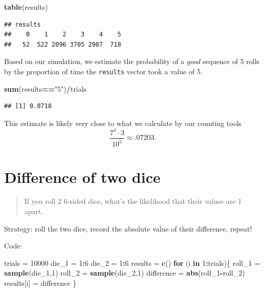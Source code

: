 \documentclass[
]{book}
\newenvironment{Shaded}{\begin{snugshade}}{\end{snugshade}}
\newcommand{\ControlFlowTok}[1]{\textcolor[rgb]{0.13,0.29,0.53}{\textbf{#1}}}
\newcommand{\DecValTok}[1]{\textcolor[rgb]{0.00,0.00,0.81}{#1}}
\newcommand{\FunctionTok}[1]{\textcolor[rgb]{0.13,0.29,0.53}{\textbf{#1}}}
\newcommand{\NormalTok}[1]{#1}
\newcommand{\OtherTok}[1]{\textcolor[rgb]{0.56,0.35,0.01}{#1}}
\newcommand{\SpecialCharTok}[1]{\textcolor[rgb]{0.81,0.36,0.00}{\textbf{#1}}}
\newcommand{\StringTok}[1]{\textcolor[rgb]{0.31,0.60,0.02}{#1}}
\theoremstyle{definition}
\theoremstyle{definition}
\theoremstyle{definition}
\theoremstyle{definition}
\theoremstyle{remark}
\begin{document}
\begin{Shaded}
\begin{Highlighting}[]
\FunctionTok{table}\NormalTok{(results)}
\end{Highlighting}
\end{Shaded}

\begin{verbatim}
## results
##    0    1    2    3    4    5 
##   52  522 2096 3705 2907  718
\end{verbatim}

Based on our simulation, we estimate the probability of a \emph{good} sequence of 5 rolls by the proportion of time the \texttt{results} vector took a value of 5.

\begin{Shaded}
\begin{Highlighting}[]
\FunctionTok{sum}\NormalTok{(results}\SpecialCharTok{==}\StringTok{"5"}\NormalTok{)}\SpecialCharTok{/}\NormalTok{trials}
\end{Highlighting}
\end{Shaded}

\begin{verbatim}
## [1] 0.0718
\end{verbatim}

This estimate is likely very close to what we calculate by our counting tools \[\frac{7^4\cdot 3}{10^5} \approx .07203.\]

\section{Difference of two dice}\label{diff-2dice-R}

\begin{quote}
If you roll 2 6-sided dice, what's the likelihood that their values are 1 apart.
\end{quote}

Strategy: roll the two dice, record the absolute value of their difference, repeat!

Code:

\begin{Shaded}
\begin{Highlighting}[]
\NormalTok{trials }\OtherTok{=} \DecValTok{10000}
\NormalTok{die\_1 }\OtherTok{=} \DecValTok{1}\SpecialCharTok{:}\DecValTok{6}
\NormalTok{die\_2 }\OtherTok{=} \DecValTok{1}\SpecialCharTok{:}\DecValTok{6}
\NormalTok{results }\OtherTok{=} \FunctionTok{c}\NormalTok{()}
\ControlFlowTok{for}\NormalTok{ (i }\ControlFlowTok{in} \DecValTok{1}\SpecialCharTok{:}\NormalTok{trials)\{}
\NormalTok{  roll\_1 }\OtherTok{=} \FunctionTok{sample}\NormalTok{(die\_1,}\DecValTok{1}\NormalTok{)}
\NormalTok{  roll\_2 }\OtherTok{=} \FunctionTok{sample}\NormalTok{(die\_2,}\DecValTok{1}\NormalTok{)}
\NormalTok{  difference }\OtherTok{=} \FunctionTok{abs}\NormalTok{(roll\_1}\SpecialCharTok{{-}}\NormalTok{roll\_2)}
\NormalTok{  results[i] }\OtherTok{=}\NormalTok{ difference}
\NormalTok{\}}
\end{Highlighting}
\end{Shaded}
\end{document}
